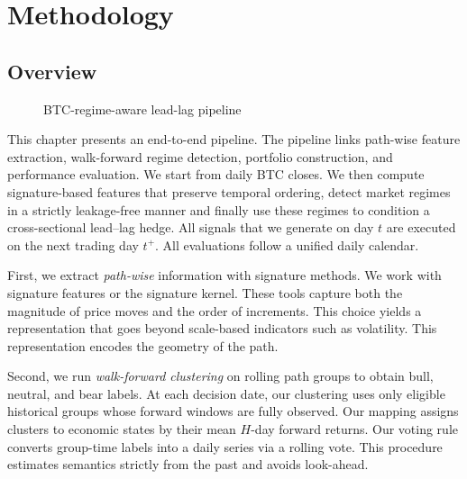 \chapter{Methodology}
\section{Overview}

\begin{figure}[t]
\centering
{}
\caption{BTC-regime-aware lead-lag pipeline}
\end{figure}

This chapter presents an end-to-end pipeline. The pipeline links path-wise feature extraction, walk-forward regime detection, portfolio construction, and performance evaluation. We start from daily BTC closes. We then compute signature-based features that preserve temporal ordering, detect market regimes in a strictly leakage-free manner and finally use these regimes to condition a cross-sectional lead--lag hedge. All signals that we generate on day $t$ are executed on the next trading day $t^+$. All evaluations follow a unified daily calendar.

First, we extract \emph{path-wise} information with signature methods. We work with signature features or the signature kernel. These tools capture both the magnitude of price moves and the order of increments. This choice yields a representation that goes beyond scale-based indicators such as volatility. This representation encodes the geometry of the path.

Second, we run \emph{walk-forward clustering} on rolling path groups to obtain bull, neutral, and bear labels. At each decision date, our clustering uses only eligible historical groups whose forward windows are fully observed. Our mapping assigns clusters to economic states by their mean $H$-day forward returns. Our voting rule converts group-time labels into a daily series via a rolling vote. This procedure estimates semantics strictly from the past and avoids look-ahead.

